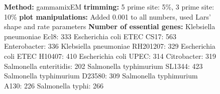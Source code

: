 \documentclass[a4paper,10pt]{article}
\begin{document}
\begin{figure}
{\textbf{Method:} gammamixEM \newline
\textbf{trimming:} 5 prime site: 5\%, 3 prime site: 10\%\newline
\textbf{plot manipulations:} Added 0.001 to all numbers, used Lars' shape and rate parameters \newline
\textbf{Number of essential genes:}\newline
Klebsiella pneumoniae Ecl8: 333\newline
Escherichia coli ETEC CS17: 563\newline
Enterobacter: 336\newline
Klebsiella pneumoniae RH201207: 329\newline
Escherichia coli ETEC H10407: 410\newline
Escherichia coli UPEC: 314\newline
Citrobacter: 319\newline
Salmonella enteritidis: 202\newline
Salmonella typhimurium SL1344: 423\newline
Salmonella typhimurium D23580: 309\newline
Salmonella typhimurium A130: 226\newline
Salmonella typhi: 266}
\end{figure}
\end{document}
